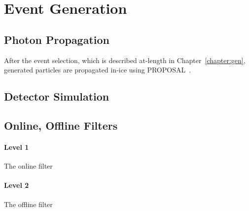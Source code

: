 \documentclass[main.tex]{subfiles}
\begin{document}
\section{Event Generation}

\subsection{Photon Propagation}

After the event selection, which is described at-length in Chapter~\ref{chapter:gen}, generated particles are propagated in-ice using PROPOSAL~\cite{Koehne:2013gpa}. 

\subsection{Detector Simulation}

\subsection{Online, Offline Filters}

\paragraph{Level 1}

The online filter

\paragraph{Level 2}

The offline filter 
\end{document}
